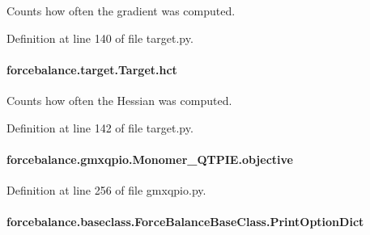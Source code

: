 Counts how often the gradient was computed. 



Definition at line 140 of file target.\-py.

\hypertarget{classforcebalance_1_1target_1_1Target_a5b5a42f78052b47f29ed4b940c6111a1}{
\paragraph[{hct}]{\setlength{\rightskip}{0pt plus 5cm}forcebalance.\-target.\-Target.\-hct\hspace{0.3cm}{\ttfamily [inherited]}}}\label{classforcebalance_1_1target_1_1Target_a5b5a42f78052b47f29ed4b940c6111a1}


Counts how often the Hessian was computed. 



Definition at line 142 of file target.\-py.

\hypertarget{classforcebalance_1_1gmxqpio_1_1Monomer__QTPIE_a0ae55c79486f2f6e3f7bc0bb7f4f387c}{
\paragraph[{objective}]{\setlength{\rightskip}{0pt plus 5cm}forcebalance.\-gmxqpio.\-Monomer\-\_\-\-Q\-T\-P\-I\-E.\-objective}}\label{classforcebalance_1_1gmxqpio_1_1Monomer__QTPIE_a0ae55c79486f2f6e3f7bc0bb7f4f387c}


Definition at line 256 of file gmxqpio.\-py.

\hypertarget{classforcebalance_1_1baseclass_1_1ForceBalanceBaseClass_a5c55e661e746d1a4443f4e0bc34ebe05}{
\paragraph[{Print\-Option\-Dict}]{\setlength{\rightskip}{0pt plus 5cm}forcebalance.\-baseclass.\-Force\-Balance\-Base\-Class.\-Print\-Option\-Dict\hspace{0.3cm}{\ttfamily [inherited]}}}\label{classforcebalance_1_1baseclass_1_1ForceBalanceBaseClass_a5c55e661e746d1a4443f4e0bc34ebe05}


